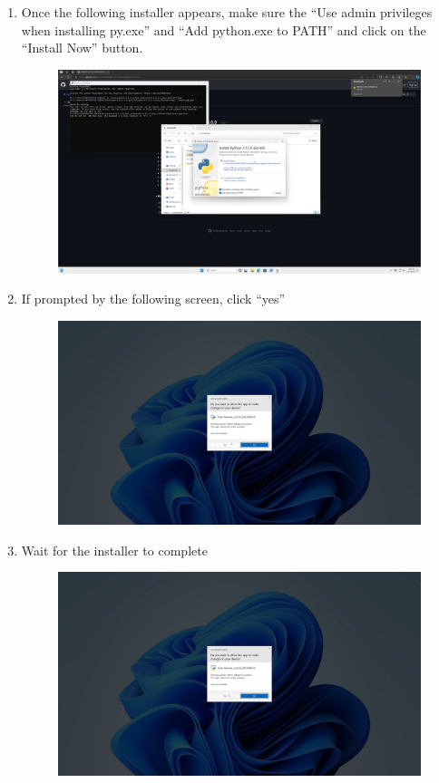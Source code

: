 \documentclass[12pt]{article}
\begin{document}
\begin{center}
\begin{enumerate}
\begin{figure}[H]
		      \end{figure}
		\item Once the following installer appears, make sure the ``Use admin privileges when installing py.exe'' and ``Add python.exe to PATH'' and click on the ``Install Now'' button.
		      \begin{figure}[H]
			      \includegraphics[width=\textwidth]{Figures/Windows-Python-Menu-1.png}
		      \end{figure}
		\item If prompted by the following screen, click ``yes''
		      \begin{figure}[H]
			      \includegraphics[width=\textwidth]{Figures/Windows-UAC-Python-1.png}
		      \end{figure}
		\item Wait for the installer to complete
		      \begin{figure}[H]
			      \includegraphics[width=\textwidth]{Figures/Windows-UAC-Python-2.png}

\end{figure}
\end{enumerate}
\end{center}
\end{document}
